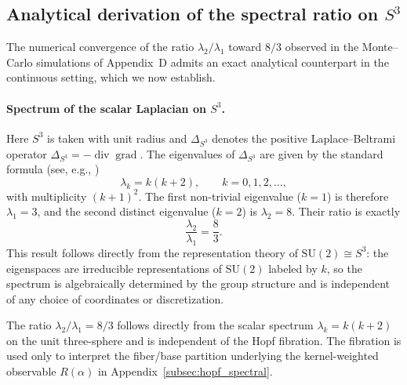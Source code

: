 \subsection{Analytical derivation of the spectral ratio on $S^3$}
  \label{sec:analytical_ratio}

  The numerical convergence of the ratio $\lambda_2 / \lambda_1$ toward $8/3$ observed in
  the Monte--Carlo simulations of Appendix~D admits an exact analytical counterpart in the
  continuous setting, which we now establish.

  \paragraph{Spectrum of the scalar Laplacian on $S^3$.}
    Here $S^3$ is taken with unit radius and $\Delta_{S^3}$ denotes the positive
    Laplace--Beltrami operator $\Delta_{S^3} = -\operatorname{div}\operatorname{grad}$.
    The eigenvalues of $\Delta_{S^3}$ are given by the standard formula
    (see, e.g., \cite{Berger1971})
    \begin{equation}
      \label{eq:S3spectrum}
      \lambda_k = k(k + 2), \qquad k = 0, 1, 2, \ldots,
    \end{equation}
    with multiplicity $(k+1)^2$.
    The first non-trivial eigenvalue ($k=1$) is therefore $\lambda_1 = 3$,
    and the second distinct eigenvalue ($k=2$) is $\lambda_2 = 8$.
    Their ratio is exactly
    \begin{equation}
      \label{eq:exact_ratio}
      \frac{\lambda_2}{\lambda_1} = \frac{8}{3}.
    \end{equation}
    This result follows directly from the representation theory of
    $\mathrm{SU}(2) \cong S^3$: the eigenspaces are irreducible representations of
    $\mathrm{SU}(2)$ labeled by $k$, so the spectrum is algebraically determined by the
    group structure and is independent of any choice of coordinates or discretization.

    \begin{remark}
      The ratio $\lambda_2/\lambda_1=8/3$ follows directly from the scalar spectrum $\lambda_k=k(k+2)$ on the unit
      three-sphere and is independent of the Hopf fibration.
      The fibration is used only to interpret the fiber/base partition underlying the kernel-weighted observable
      $R(\alpha)$ in Appendix~\ref{subsec:hopf_spectral}.
    \end{remark}

